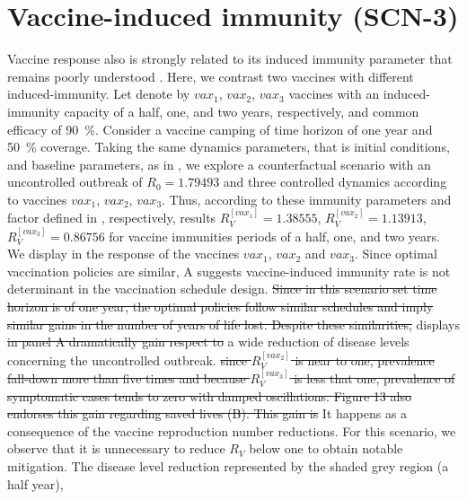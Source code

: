 \section*{Vaccine-induced immunity (SCN-3)}
    Vaccine response also is strongly related to its induced immunity
    \textemdash parameter that remains poorly understood
    \cite{Jeyanathan2020}.
    Here, we contrast two vaccines with different induced-immunity. Let
    denote by $vax_1$, $vax_2$, $vax_3$ vaccines with an induced-immunity
    capacity of a half, one, and two years, respectively, and common efficacy
    of \SI{90}{\percent}.
    Consider a vaccine camping of time horizon of one year and
    \SI{50}{\percent} coverage. Taking the same dynamics parameters, that is
    initial conditions, and baseline parameters, as in
    , we explore a counterfactual scenario with an
    uncontrolled outbreak of $R_0 = \num{1.79493}$ and three controlled
    dynamics according to vaccines $vax_1$, $vax_2$, $vax_3$. Thus, according
    to these immunity parameters and factor defined in
    , respectively, results
    $R_V^{[vax_1]} = \num{1.38555}$,
    $R_V^{[vax_2]} = \num{1.13913}$,
    $R_V^{[vax_3]} = \num{0.86756}$
    for vaccine immunities periods of a half, one, and two years. We display in
     the response of the
    vaccines $vax_1$, $vax_2$ and $vax_3$. \az Since optimal vaccination
    policies are similar,  A
    suggests vaccine-induced immunity rate is not determinant in the
    vaccination schedule design. \st{Since in this  scenario set time
    horizon is of one year, the optimal policies follow similar schedules and
    imply similar gains in the number of years of life lost. Despite these
    similarities,} \za {}
    displays \az \st{in panel A dramatically gain respect to} a wide reduction
    of disease levels concerning the uncontrolled outbreak.
    \st{\textemdash since $R_V ^{[vax_2]}$ is near to one, prevalence
    fall-down more than five times and because $R_V ^{[vax_3]}$ is less that
    one, prevalence of symptomatic cases tends to zero with damped
    oscillations.
    Figure 13 also endorses this gain regarding
    saved lives (B). This gain is}
    It happens as a consequence of the vaccine reproduction number reductions.
    For this scenario, we observe that it is unnecessary to reduce $R_V$ below
     one to obtain notable mitigation. The disease level reduction
    represented by the shaded grey region (a half year),
